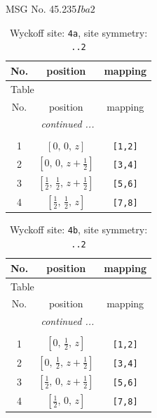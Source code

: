 \documentclass[fleqn,8pt]{jsarticle}
\begin{document}
\setcounter{MaxMatrixCols}{32}

\renewcommand{\tablename}{Table~}
\renewcommand{\figurename}{Figure~}
\begin{center}
\LARGE
MSG No. 45.235\quad$Iba2$
\end{center}
\renewcommand{\arraystretch}{1.2}
\begin{longtable}{ccc}
\caption{Wyckoff site: {\tt 4a}, site symmetry: {\tt ..2}}
 \\
 \hline \hline
No. & position & mapping \\ \hline \endfirsthead

\multicolumn{2}{l}{\tablename\ \thetable{}} \\
 \hline \hline
No. & position & mapping \\ \hline \endhead

 \hline \hline
\multicolumn{2}{r}{\footnotesize\it continued ...} \\ \endfoot

 \hline \hline
\multicolumn{2}{r}{} \\ \endlastfoot

1 & $\left[ 0,\, 0,\, z \right]$ & {\tt [1,2]} \\ \hline
2 & $\left[ 0,\, 0,\, z + \frac{1}{2} \right]$ & {\tt [3,4]} \\ \hline
3 & $\left[ \frac{1}{2},\, \frac{1}{2},\, z + \frac{1}{2} \right]$ & {\tt [5,6]} \\ \hline
4 & $\left[ \frac{1}{2},\, \frac{1}{2},\, z \right]$ & {\tt [7,8]} \\
\end{longtable}
\renewcommand{\arraystretch}{1.2}
\begin{longtable}{ccc}
\caption{Wyckoff site: {\tt 4b}, site symmetry: {\tt ..2}}
 \\
 \hline \hline
No. & position & mapping \\ \hline \endfirsthead

\multicolumn{2}{l}{\tablename\ \thetable{}} \\
 \hline \hline
No. & position & mapping \\ \hline \endhead

 \hline \hline
\multicolumn{2}{r}{\footnotesize\it continued ...} \\ \endfoot

 \hline \hline
\multicolumn{2}{r}{} \\ \endlastfoot

1 & $\left[ 0,\, \frac{1}{2},\, z \right]$ & {\tt [1,2]} \\ \hline
2 & $\left[ 0,\, \frac{1}{2},\, z + \frac{1}{2} \right]$ & {\tt [3,4]} \\ \hline
3 & $\left[ \frac{1}{2},\, 0,\, z + \frac{1}{2} \right]$ & {\tt [5,6]} \\ \hline
4 & $\left[ \frac{1}{2},\, 0,\, z \right]$ & {\tt [7,8]} \\
\end{longtable}
\end{document}
